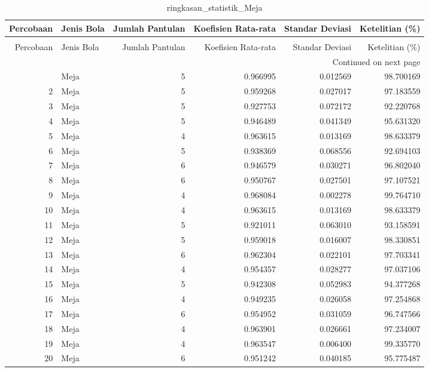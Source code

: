 \begin{longtable}{rlrrrr}
\caption{ringkasan_statistik_Meja} \label{tab:ringkasan_Meja} \\
\toprule
Percobaan & Jenis Bola & Jumlah Pantulan & Koefisien Rata-rata & Standar Deviasi & Ketelitian (\%) \\
\midrule
\endfirsthead
\caption[]{ringkasan_statistik_Meja} \\
\toprule
Percobaan & Jenis Bola & Jumlah Pantulan & Koefisien Rata-rata & Standar Deviasi & Ketelitian (\%) \\
\midrule
\endhead
\midrule
\multicolumn{6}{r}{Continued on next page} \\
\midrule
\endfoot
\bottomrule
\endlastfoot
1 & Meja & 5 & 0.966995 & 0.012569 & 98.700169 \\
2 & Meja & 5 & 0.959268 & 0.027017 & 97.183559 \\
3 & Meja & 5 & 0.927753 & 0.072172 & 92.220768 \\
4 & Meja & 5 & 0.946489 & 0.041349 & 95.631320 \\
5 & Meja & 4 & 0.963615 & 0.013169 & 98.633379 \\
6 & Meja & 5 & 0.938369 & 0.068556 & 92.694103 \\
7 & Meja & 6 & 0.946579 & 0.030271 & 96.802040 \\
8 & Meja & 6 & 0.950767 & 0.027501 & 97.107521 \\
9 & Meja & 4 & 0.968084 & 0.002278 & 99.764710 \\
10 & Meja & 4 & 0.963615 & 0.013169 & 98.633379 \\
11 & Meja & 5 & 0.921011 & 0.063010 & 93.158591 \\
12 & Meja & 5 & 0.959018 & 0.016007 & 98.330851 \\
13 & Meja & 6 & 0.962304 & 0.022101 & 97.703341 \\
14 & Meja & 4 & 0.954357 & 0.028277 & 97.037106 \\
15 & Meja & 5 & 0.942308 & 0.052983 & 94.377268 \\
16 & Meja & 4 & 0.949235 & 0.026058 & 97.254868 \\
17 & Meja & 6 & 0.954952 & 0.031059 & 96.747566 \\
18 & Meja & 4 & 0.963901 & 0.026661 & 97.234007 \\
19 & Meja & 4 & 0.963547 & 0.006400 & 99.335770 \\
20 & Meja & 6 & 0.951242 & 0.040185 & 95.775487 \\
\end{longtable}
